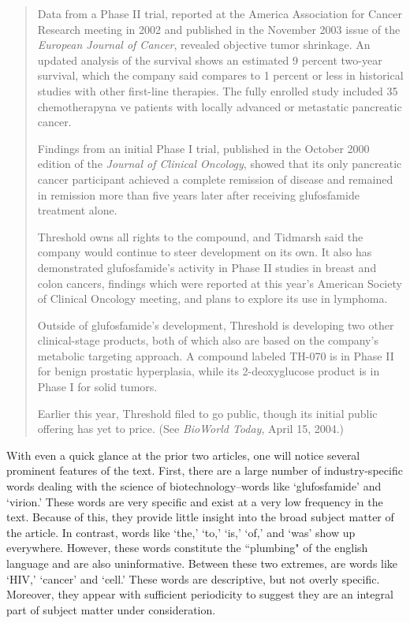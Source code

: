 \begin{singlespace}
\begin{small}
\begin{quotation}
Data from a Phase II trial, reported at the America Association for Cancer Research meeting in 2002 and published in the November 2003 issue of the \emph{European Journal of Cancer}, revealed objective tumor shrinkage. An updated analysis of the survival shows an estimated 9 percent two-year survival, which the company said compares to 1 percent or less in historical studies with other first-line therapies. The fully enrolled study included 35 chemotherapyna ve patients with locally advanced or metastatic pancreatic cancer.  

Findings from an initial Phase I trial, published in the October 2000 edition of the \emph{Journal of Clinical Oncology}, showed that its only pancreatic cancer participant achieved a complete remission of disease and remained in remission more than five years later after receiving glufosfamide treatment alone.

Threshold owns all rights to the compound, and Tidmarsh said the company would continue to steer development on its own. It also has demonstrated glufosfamide's activity in Phase II studies in breast and colon cancers, findings which were reported at this year's American Society of Clinical Oncology meeting, and plans to explore its use in lymphoma.

Outside of glufosfamide's development, Threshold is developing two other clinical-stage products, both of which also are based on the company's metabolic targeting approach. A compound labeled TH-070 is in Phase II for benign prostatic hyperplasia, while its 2-deoxyglucose product is in Phase I for solid tumors.

Earlier this year, Threshold filed to go public, though its initial public offering has yet to price. (See \emph{BioWorld Today}, April 15, 2004.) 
\end{quotation}
\end{small}
\end{singlespace}

With even a quick glance at the prior two articles, one will notice several prominent features of the text. First, there are a large number of industry-specific words dealing with the science of biotechnology--words like `glufosfamide' and `virion.' These words are very specific and exist at a very low frequency in the text. Because of this, they provide little insight into the broad subject matter of the article. In contrast, words like `the,' `to,' `is,' `of,' and `was' show up everywhere. However, these words constitute the ``plumbing" of the english language and are also uninformative. Between these two extremes, are words like `HIV,' `cancer' and `cell.' These words are descriptive, but not overly specific. Moreover, they appear with sufficient periodicity to suggest they are an integral part of subject matter under consideration. 

